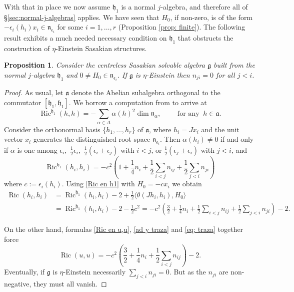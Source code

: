 \documentclass[12pt, twoside]{amsart}
\def\g{\mathfrak{g}}
\def\h{\mathfrak{h}}
\def\n{\mathfrak{n}}
\def\a{\mathfrak{a}}
\def\ric{\operatorname{Ric}}
\newtheorem{prop}[definition]{Proposition}
\theoremstyle{definition}
\begin{document}
With that in place we now assume $\h_1$ is a normal $j$-algebra, and therefore all of \S \ref{sec:normal-j-algebras} applies. We have seen that $H_0$, if non-zero, is of the form $-\epsilon_{i}(h_i)x_i \in \n_{\epsilon_i}$ for some $i=1,\ldots,  r$ (Proposition \ref{prop: finite}). 
The following result exhibits a much needed necessary condition on $\h_1$ that obstructs the construction of $\eta$-Einstein Sasakian structures.

\begin{prop}\label{prop: restriction} 
Consider the centreless Sasakian solvable algebra $\g$ built from the normal $j$-algebra $\h_1$ and $0\neq H_0\in \n_{\epsilon_i}$. 
If $\g$ is $\eta$-Einstein then $n_{ji}=0$ for all $j<i$.
\end{prop}

\begin{proof}
As usual, let $\a$ denote the Abelian subalgebra orthogonal to the commutator $[\h_1, \h_1]$. We borrow a computation from \cite[Section 3]{D} to arrive at 
 \begin{equation}\label{ricci en a}
     \ric^{\h_1}(h, h)=-\sum_{\alpha \in \Delta} \alpha(h)^{2}\dim \n_{\alpha}, \qquad  \text{ for any }\ h\in \a.
 \end{equation}
 Consider the orthonormal basis $\{h_1, \ldots,  h_r\}$ of $\a$, where $h_i=Jx_i$ and the unit vector $x_i$ generates the distinguished root space $\n_{\epsilon_i}$. Then $\alpha(h_i)\neq 0$ if and only if $\alpha$ is one among $\epsilon_i$,\ $\frac 12 \epsilon_i$,\ $\frac{1}{2}(\epsilon_i \pm \epsilon_ j)$ with $i<j$, or $\frac{1}{2}(\epsilon_j \pm \epsilon_i)$ with $j<i$, and 
 \begin{equation}
     \ric^{\h_1}(h_i, h_i)=-c^2\left(1+\frac{1}{4}n_i+\frac{1}{2}\sum_{i<j}n_{ij}+\frac{1}{2}\sum_{j<i}n_{ji}\right)
 \end{equation}
 where $c:=\epsilon_i(h_i)$. 
 Using \eqref{Ric en h1} with $H_0=-cx_i$ we obtain
\begin{equation*}\begin{split}
     \ric(h_i,h_i)&=\ric^{\h_1}(h_i,h_i)-2+\frac{1}{2}\langle \nonumber \theta(Jh_i,h_i),H_0 \rangle \\ 
     &=\ric^{\h_1}(h_i,h_i)-2-\frac{1}{2}c^2
     =-c^2\left(\frac{3}{2}+\frac{1}{4}n_i+\frac{1}{2}\sum_{i<j}n_{ij}+\frac{1}{2}\sum_{j<i}n_{ji}\right)-2. 
     \end{split}\end{equation*}

 On the other hand, formulas \eqref{Ric en u,u}, \eqref{ad y traza} and \eqref{eq: traza} together force
\[ \ric(u,u)=-c^{2}\left(\frac{3}{2}+\frac{1}{4}n_i+\frac{1}{2}\sum_{i<j}n_{ij}\right)-2. \]
Eventually, if $\g$ is $\eta$-Einstein necessarily $\sum_{j<i} n_{ji}=0$. But as the $n_{ji}$ are non-negative, they must all vanish.
\end{proof}
\end{document}
